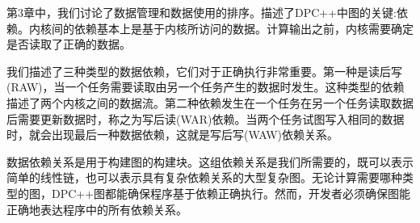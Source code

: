 第3章中，我们讨论了数据管理和数据使用的排序。描述了DPC++中图的关键:依赖。内核间的依赖基本上是基于内核所访问的数据。计算输出之前，内核需要确定是否读取了正确的数据。\par

我们描述了三种类型的数据依赖，它们对于正确执行非常重要。第一种是读后写(RAW)，当一个任务需要读取由另一个任务产生的数据时发生。这种类型的依赖描述了两个内核之间的数据流。第二种依赖发生在一个任务在另一个任务读取数据后需要更新数据时，称之为写后读(WAR)依赖。当两个任务试图写入相同的数据时，就会出现最后一种数据依赖，这就是写后写(WAW)依赖关系。\par

数据依赖关系是用于构建图的构建块。这组依赖关系是我们所需要的，既可以表示简单的线性链，也可以表示具有复杂依赖关系的大型复杂图。无论计算需要哪种类型的图，DPC++图都能确保程序基于依赖正确执行。然而，开发者必须确保图能正确地表达程序中的所有依赖关系。\par